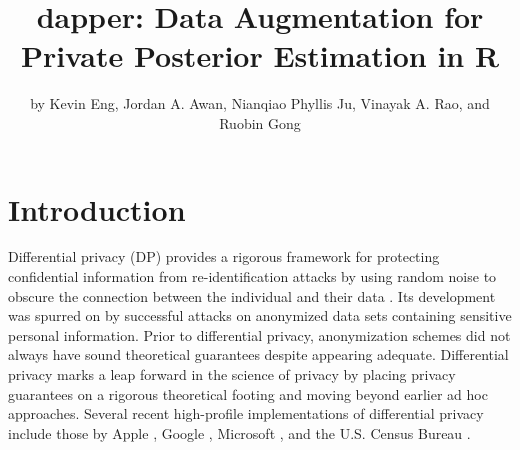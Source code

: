 \title{dapper: Data Augmentation for Private Posterior Estimation in R}


\author{by Kevin Eng, Jordan A. Awan, Nianqiao Phyllis Ju, Vinayak A. Rao, and Ruobin Gong}

\maketitle


\section{Introduction}\label{sec:intro}

Differential privacy (DP) provides a rigorous framework for protecting
confidential information from re-identification attacks by using random
noise to obscure the connection between the individual and their data \citep{Dwork2006}.
Its development was spurred on by successful attacks
on anonymized data sets containing sensitive personal information. Prior
to differential privacy, anonymization schemes did not always have sound
theoretical guarantees despite appearing adequate.
Differential privacy marks a leap forward in the science of privacy by placing
privacy guarantees on a rigorous theoretical footing and moving beyond earlier
ad hoc approaches.
Several recent high-profile
implementations of differential privacy include those by Apple \citep{tang2017privacy}, Google \citep{Erlingsson_2014}, Microsoft \citep{ding2017collecting}, and the
U.S. Census Bureau \citep{Abowd2018}.

